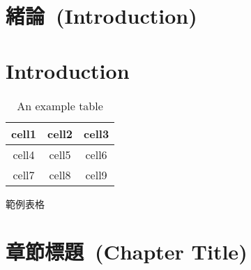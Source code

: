 \documentclass[master]{NTHUthesis}
\begin{document}
\makecover


\begin{abstractZH}

\end{abstractZH}

\begin{acknowledgementsZH}

\end{acknowledgementsZH}

\begin{abstractEN}

\end{abstractEN}

\begin{acknowledgementsEN}

\end{acknowledgementsEN}

\maketoc

\ifdefined \zhmode \else
    \listofalgorithms
    \clearpage
\fi


\ifdefined \zhmode
    \chapter{緒論~(Introduction)}
    \zhlipsum[1-3]
\else
    \chapter{Introduction}
    \lipsum[1-3]
\fi

\begin{table}[t]
    \centering
    \begin{tabular}{ c | c c }
    \toprule
     cell1 & cell2 & cell3 \\
    \midrule
     cell4 & cell5 & cell6 \\  
     cell7 & cell8 & cell9 \\
    \bottomrule
    \end{tabular}
    \ifdefined \zhmode
        \caption{範例表格}
    \else
        \caption{An example table}
    \fi
    \label{tab:my_label}
\end{table}

\ifdefined \zhmode
    \chapter{章節標題~(Chapter Title)}
    \zhlipsum[1-3]
\else
\end{document}
